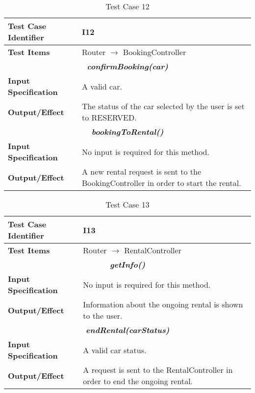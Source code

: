 \begin{table}[h]
	\begin{tabularx}{\textwidth}{l X}
		\hline
		\textbf{Test Case Identifier}	&	I12\\	\hline
		\textbf{Test Items}			&	Router $\rightarrow$ BookingController \\	\hline\hline
		\multicolumn{2}{c}{\textbf{\textit{confirmBooking(car)}}}	\\	\hline
			\textbf{Input Specification}	&	A valid car.\\	\hline
			\textbf{Output/Effect}	&	The status of the car selected by the user is set to RESERVED.\\	\hline\hline
		\multicolumn{2}{c}{\textbf{\textit{bookingToRental()}}}	\\	\hline
			\textbf{Input Specification}	&	No input is required for this method.\\	\hline
			\textbf{Output/Effect}	&	A new rental request is sent to the BookingController in order to start the rental.\\	\hline
	\end{tabularx}
	\captionsetup{textformat=empty,labelformat=blank}
	\caption{Test Case 12}
	\label{table:template-table-12}
\end{table}

\begin{table}[h]
	\begin{tabularx}{\textwidth}{l X}
		\hline
		\textbf{Test Case Identifier}	&	I13\\	\hline
		\textbf{Test Items}			&	Router $\rightarrow$ RentalController \\	\hline\hline
		\multicolumn{2}{c}{\textbf{\textit{getInfo()}}}	\\	\hline
			\textbf{Input Specification}	&	No input is required for this method.\\	\hline
			\textbf{Output/Effect}	&	Information about the ongoing rental is shown to the user.\\	\hline\hline
		\multicolumn{2}{c}{\textbf{\textit{endRental(carStatus)}}}	\\	\hline
			\textbf{Input Specification}	&	A valid car status.\\	\hline
			\textbf{Output/Effect}	&	A request is sent to the RentalController in order to end the ongoing rental.\\	\hline
	\end{tabularx}
	\captionsetup{textformat=empty,labelformat=blank}
	\caption{Test Case 13}
	\label{table:template-table-13}
\end{table}

